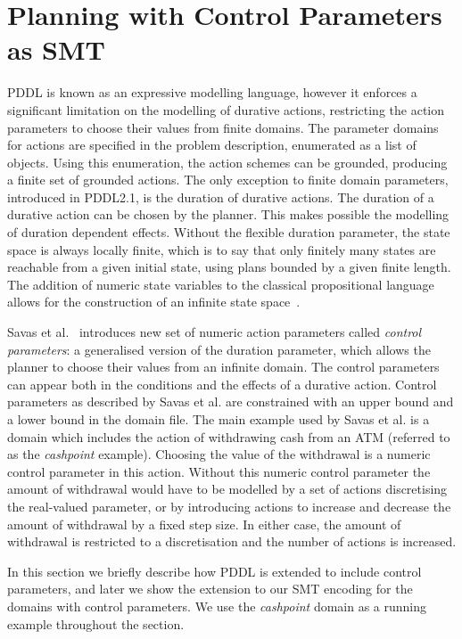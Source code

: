 \section{Planning with Control Parameters as SMT}\label{sec:control_parameters}

PDDL is known as an expressive modelling language, however it enforces a significant limitation on the modelling of durative actions, restricting the action parameters to choose their values from finite domains. The parameter domains for actions are specified in the problem description, enumerated as a list of objects. Using this enumeration, the action schemes can be grounded, producing a finite set of grounded actions.
%
The only exception to finite domain parameters, introduced in PDDL2.1, is the duration of durative actions. The duration of a durative action can be chosen by the planner. This makes possible the modelling of duration dependent effects. Without the flexible duration parameter, the state space is always locally finite, which is to say that only finitely many states are reachable from a given initial state, using plans bounded by a given finite length. The addition of numeric state variables to the classical propositional language allows for the construction of an infinite state space~\cite{savas2016planning}.

Savas et al.~\cite{savas2016planning} introduces new set of numeric action parameters called \textit{control parameters}: a generalised version of the duration parameter, which allows the planner to choose their values from an infinite domain. The control parameters can appear both in the conditions and the effects of a durative action. Control parameters as described by Savas et al. are constrained with an upper bound and a lower bound in the domain file. The main example used by Savas et al. is a domain which includes the action of withdrawing cash from an ATM (referred to as the \textit{cashpoint} example). Choosing the value of the withdrawal is a numeric control parameter in this action. Without this numeric control parameter the amount of withdrawal would have to be modelled by a set of actions discretising the real-valued parameter, or by introducing actions to increase and decrease the amount of withdrawal by a fixed step size. In either case, the amount of withdrawal is restricted to a discretisation and the number of actions is increased.

In this section we briefly describe how PDDL is extended to include control parameters, and later we show the extension to our SMT encoding for the domains with control parameters. We use the \textit{cashpoint} domain as a running example throughout the section.

